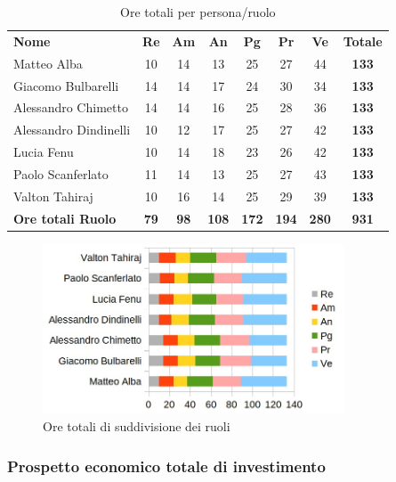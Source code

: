 		\begin{table} [h!]
			\begin{center}
				\begin{tabular} { m{3.5cm} c c c c c c c }
					\rowcolor{lightgray}
					\textbf{Nome} & \textbf{Re} & \textbf{Am} & \textbf{An} & \textbf{Pg} & \textbf{Pr} & \textbf{Ve} & \textbf{Totale} \\
					Matteo Alba & 10 & 14 & 13 & 25 & 27 & 44 & \textbf{133} \\
					Giacomo Bulbarelli & 14 & 14 & 17 & 24 & 30 & 34 & \textbf{133} \\
					Alessandro Chimetto & 14 & 14 & 16 & 25 & 28 & 36 & \textbf{133} \\
					Alessandro Dindinelli & 10 & 12 & 17 & 25 & 27 & 42 & \textbf{133} \\
					Lucia Fenu & 10 & 14 & 18 & 23 & 26 & 42 & \textbf{133} \\
					Paolo Scanferlato & 11 & 14 & 13 & 25 & 27 & 43 & \textbf{133} \\
					Valton Tahiraj & 10 & 16 & 14 & 25 & 29 & 39 & \textbf{133} \\
					\textbf{Ore totali Ruolo} & \textbf{79} & \textbf{98} & \textbf{108} & \textbf{172} & \textbf{194}& \textbf{280} & \textbf{931}
				\end{tabular}
				\caption{Ore totali per persona/ruolo}
			\end{center}
		\end{table}
	
		\begin{figure} [h!]
			\centering
			\includegraphics[width=0.8\textwidth]{res/img/grafici/ore_totali_di_investimento.jpg}
			\caption{Ore totali di suddivisione dei ruoli} 
		\end{figure}
	
	\newpage
	
	\subsubsection{Prospetto economico totale di investimento}
	
